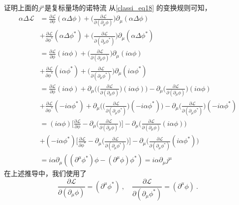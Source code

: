 \begin{exercise}{证明上面的$j^\mu$是复标量场的诺特流}
从\autoref{classi_eq18} 的变换规则可知，
\begin{align}\nonumber
\alpha \Delta \mathcal L & = \frac{\partial \mathcal L}{\partial\phi} (\alpha \Delta \phi) +\bigg( \frac{\partial \mathcal L}{\partial(\partial_\mu\phi)} \bigg) \partial_\mu(\alpha\Delta\phi) \\\nonumber
&+\frac{\partial \mathcal L}{\partial\phi^*} (\alpha \Delta \phi^*) +\bigg( \frac{\partial \mathcal L}{\partial(\partial_\mu\phi^*)} \bigg) \partial_\mu(\alpha\Delta\phi^*) \\\nonumber
& = \frac{\partial \mathcal L}{\partial\phi} ( i \alpha \phi) +\bigg( \frac{\partial \mathcal L}{\partial(\partial_\mu\phi)} \bigg) \partial_\mu(i \alpha \phi) \\\nonumber
& +\frac{\partial \mathcal L}{\partial\phi^*} (i \alpha \phi^*) +\bigg( \frac{\partial \mathcal L}{\partial(\partial_\mu\phi^*)} \bigg) \partial_\mu(i \alpha \phi^*) \\\nonumber
& = \frac{\partial \mathcal L}{\partial\phi} ( i \alpha \phi) +\partial_\mu \bigg(\bigg( \frac{\partial \mathcal L}{\partial(\partial_\mu\phi)} \bigg) (i \alpha \phi)\bigg) -\partial_\mu\bigg( \frac{\partial \mathcal L}{\partial(\partial_\mu\phi)} \bigg)(i\alpha\phi) \\\nonumber
& +\frac{\partial \mathcal L}{\partial\phi^*} (-i \alpha \phi^*) + \partial_\mu\bigg(\bigg( \frac{\partial \mathcal L}{\partial(\partial_\mu\phi^*)} \bigg) (-i \alpha \phi^*) \bigg) -\partial_\mu\bigg( \frac{\partial \mathcal L}{\partial(\partial_\mu\phi^*)} \bigg)(-i\alpha\phi^*) \\\nonumber
& = (i\alpha\phi) \bigg[ \frac{\partial \mathcal L}{\partial\phi} - \partial_\mu\bigg(\frac{\partial \mathcal L}{\partial(\partial_\mu\phi)}\bigg) \bigg] - \partial_\mu \bigg( \frac{\partial \mathcal L}{\partial(\partial_\mu\phi)} (i\alpha\phi) \bigg)\\\nonumber
& +(-i\alpha\phi^*) \bigg[ \frac{\partial \mathcal L}{\partial\phi^*} - \partial_\mu\bigg(\frac{\partial \mathcal L}{\partial(\partial_\mu\phi^*)}\bigg) \bigg] - \partial_\mu \bigg( \frac{\partial \mathcal L}{\partial(\partial_\mu\phi^*)} (i\alpha\phi^*) \bigg)\\
&= i \alpha \partial_\mu ((\partial^\mu\phi^*)\phi-(\partial^\mu\phi)\phi^*) = i \alpha \partial_\mu j^\mu
\end{align}
在上述推导中，我们使用了
\begin{equation}
\frac{\partial\mathcal L}{\partial(\partial_\mu\phi)}= (\partial^\mu\phi^*)~,\quad
\frac{\partial\mathcal L}{\partial(\partial_\mu\phi^*)}= (\partial^\mu\phi)~.
\end{equation}
\end{exercise}
